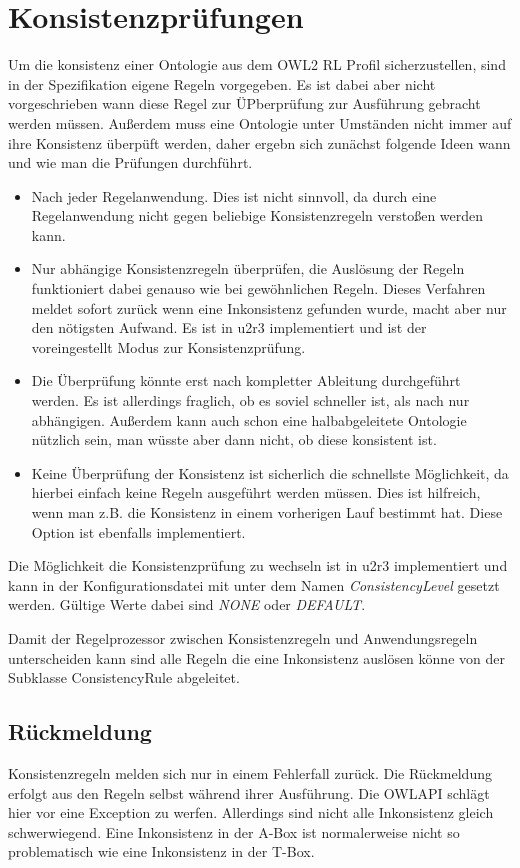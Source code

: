 \section{Konsistenzprüfungen}
Um die konsistenz einer Ontologie aus dem OWL2 RL Profil sicherzustellen, sind in der Spezifikation eigene Regeln vorgegeben. Es ist dabei aber nicht vorgeschrieben wann diese Regel zur ÜPberprüfung zur Ausführung gebracht werden müssen. Außerdem muss eine Ontologie unter Umständen nicht immer auf ihre Konsistenz überpüft werden, daher ergebn sich zunächst folgende Ideen wann und wie man die Prüfungen durchführt.

\begin{itemize}
  \item Nach jeder Regelanwendung. Dies ist nicht sinnvoll, da durch eine Regelanwendung nicht gegen beliebige Konsistenzregeln verstoßen werden kann.
  \item Nur abhängige Konsistenzregeln überprüfen, die Auslösung der Regeln funktioniert dabei genauso wie bei gewöhnlichen Regeln. Dieses Verfahren meldet sofort zurück wenn eine Inkonsistenz gefunden wurde, macht aber nur den nötigsten Aufwand. Es ist in u2r3 implementiert und ist der voreingestellt Modus zur Konsistenzprüfung.
  \item Die Überprüfung könnte erst nach kompletter Ableitung durchgeführt werden. Es ist allerdings fraglich, ob es soviel schneller ist, als nach nur abhängigen. Außerdem kann auch schon eine halbabgeleitete Ontologie nützlich sein, man wüsste aber dann nicht, ob diese konsistent ist.
  \item Keine Überprüfung der Konsistenz ist sicherlich die schnellste Möglichkeit, da hierbei einfach keine Regeln ausgeführt werden müssen. Dies ist hilfreich, wenn man z.B. die Konsistenz in einem vorherigen Lauf bestimmt hat. Diese Option ist ebenfalls implementiert.
\end{itemize} 
Die Möglichkeit die Konsistenzprüfung zu wechseln ist in u2r3 implementiert und kann in der Konfigurationsdatei mit unter dem Namen \emph{ConsistencyLevel} gesetzt werden. Gültige Werte dabei sind \emph{NONE} oder \emph{DEFAULT}.

Damit der Regelprozessor zwischen Konsistenzregeln und Anwendungsregeln unterscheiden kann sind alle Regeln die eine Inkonsistenz auslösen könne von der Subklasse ConsistencyRule abgeleitet.

\subsection{Rückmeldung}
Konsistenzregeln melden sich nur in einem Fehlerfall zurück. Die Rückmeldung erfolgt aus den Regeln selbst während ihrer Ausführung. Die OWLAPI schlägt hier vor eine Exception zu werfen. Allerdings sind nicht alle Inkonsistenz gleich schwerwiegend. Eine Inkonsistenz in der A-Box ist normalerweise nicht so problematisch wie eine Inkonsistenz in der T-Box.

